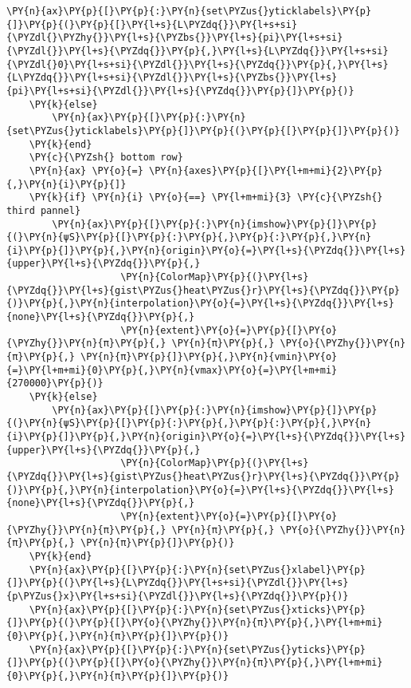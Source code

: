 \begin{Verbatim}[commandchars=\\\{\}]
        \PY{n}{ax}\PY{p}{[}\PY{p}{:}\PY{n}{set\PYZus{}yticklabels}\PY{p}{]}\PY{p}{(}\PY{p}{[}\PY{l+s}{L\PYZdq{}}\PY{l+s+si}{\PYZdl{}\PYZhy{}}\PY{l+s}{\PYZbs{}}\PY{l+s}{pi}\PY{l+s+si}{\PYZdl{}}\PY{l+s}{\PYZdq{}}\PY{p}{,}\PY{l+s}{L\PYZdq{}}\PY{l+s+si}{\PYZdl{}0}\PY{l+s+si}{\PYZdl{}}\PY{l+s}{\PYZdq{}}\PY{p}{,}\PY{l+s}{L\PYZdq{}}\PY{l+s+si}{\PYZdl{}}\PY{l+s}{\PYZbs{}}\PY{l+s}{pi}\PY{l+s+si}{\PYZdl{}}\PY{l+s}{\PYZdq{}}\PY{p}{]}\PY{p}{)}
    \PY{k}{else}
        \PY{n}{ax}\PY{p}{[}\PY{p}{:}\PY{n}{set\PYZus{}yticklabels}\PY{p}{]}\PY{p}{(}\PY{p}{[}\PY{p}{]}\PY{p}{)}
    \PY{k}{end}
    \PY{c}{\PYZsh{} bottom row}
    \PY{n}{ax} \PY{o}{=} \PY{n}{axes}\PY{p}{[}\PY{l+m+mi}{2}\PY{p}{,}\PY{n}{i}\PY{p}{]}
    \PY{k}{if} \PY{n}{i} \PY{o}{==} \PY{l+m+mi}{3} \PY{c}{\PYZsh{} third pannel}
        \PY{n}{ax}\PY{p}{[}\PY{p}{:}\PY{n}{imshow}\PY{p}{]}\PY{p}{(}\PY{n}{ψS}\PY{p}{[}\PY{p}{:}\PY{p}{,}\PY{p}{:}\PY{p}{,}\PY{n}{i}\PY{p}{]}\PY{p}{,}\PY{n}{origin}\PY{o}{=}\PY{l+s}{\PYZdq{}}\PY{l+s}{upper}\PY{l+s}{\PYZdq{}}\PY{p}{,}
                    \PY{n}{ColorMap}\PY{p}{(}\PY{l+s}{\PYZdq{}}\PY{l+s}{gist\PYZus{}heat\PYZus{}r}\PY{l+s}{\PYZdq{}}\PY{p}{)}\PY{p}{,}\PY{n}{interpolation}\PY{o}{=}\PY{l+s}{\PYZdq{}}\PY{l+s}{none}\PY{l+s}{\PYZdq{}}\PY{p}{,}
                    \PY{n}{extent}\PY{o}{=}\PY{p}{[}\PY{o}{\PYZhy{}}\PY{n}{π}\PY{p}{,} \PY{n}{π}\PY{p}{,} \PY{o}{\PYZhy{}}\PY{n}{π}\PY{p}{,} \PY{n}{π}\PY{p}{]}\PY{p}{,}\PY{n}{vmin}\PY{o}{=}\PY{l+m+mi}{0}\PY{p}{,}\PY{n}{vmax}\PY{o}{=}\PY{l+m+mi}{270000}\PY{p}{)}
    \PY{k}{else}
        \PY{n}{ax}\PY{p}{[}\PY{p}{:}\PY{n}{imshow}\PY{p}{]}\PY{p}{(}\PY{n}{ψS}\PY{p}{[}\PY{p}{:}\PY{p}{,}\PY{p}{:}\PY{p}{,}\PY{n}{i}\PY{p}{]}\PY{p}{,}\PY{n}{origin}\PY{o}{=}\PY{l+s}{\PYZdq{}}\PY{l+s}{upper}\PY{l+s}{\PYZdq{}}\PY{p}{,}
                    \PY{n}{ColorMap}\PY{p}{(}\PY{l+s}{\PYZdq{}}\PY{l+s}{gist\PYZus{}heat\PYZus{}r}\PY{l+s}{\PYZdq{}}\PY{p}{)}\PY{p}{,}\PY{n}{interpolation}\PY{o}{=}\PY{l+s}{\PYZdq{}}\PY{l+s}{none}\PY{l+s}{\PYZdq{}}\PY{p}{,}
                    \PY{n}{extent}\PY{o}{=}\PY{p}{[}\PY{o}{\PYZhy{}}\PY{n}{π}\PY{p}{,} \PY{n}{π}\PY{p}{,} \PY{o}{\PYZhy{}}\PY{n}{π}\PY{p}{,} \PY{n}{π}\PY{p}{]}\PY{p}{)}
    \PY{k}{end}
    \PY{n}{ax}\PY{p}{[}\PY{p}{:}\PY{n}{set\PYZus{}xlabel}\PY{p}{]}\PY{p}{(}\PY{l+s}{L\PYZdq{}}\PY{l+s+si}{\PYZdl{}}\PY{l+s}{p\PYZus{}x}\PY{l+s+si}{\PYZdl{}}\PY{l+s}{\PYZdq{}}\PY{p}{)}
    \PY{n}{ax}\PY{p}{[}\PY{p}{:}\PY{n}{set\PYZus{}xticks}\PY{p}{]}\PY{p}{(}\PY{p}{[}\PY{o}{\PYZhy{}}\PY{n}{π}\PY{p}{,}\PY{l+m+mi}{0}\PY{p}{,}\PY{n}{π}\PY{p}{]}\PY{p}{)}
    \PY{n}{ax}\PY{p}{[}\PY{p}{:}\PY{n}{set\PYZus{}yticks}\PY{p}{]}\PY{p}{(}\PY{p}{[}\PY{o}{\PYZhy{}}\PY{n}{π}\PY{p}{,}\PY{l+m+mi}{0}\PY{p}{,}\PY{n}{π}\PY{p}{]}\PY{p}{)}

\end{Verbatim}

